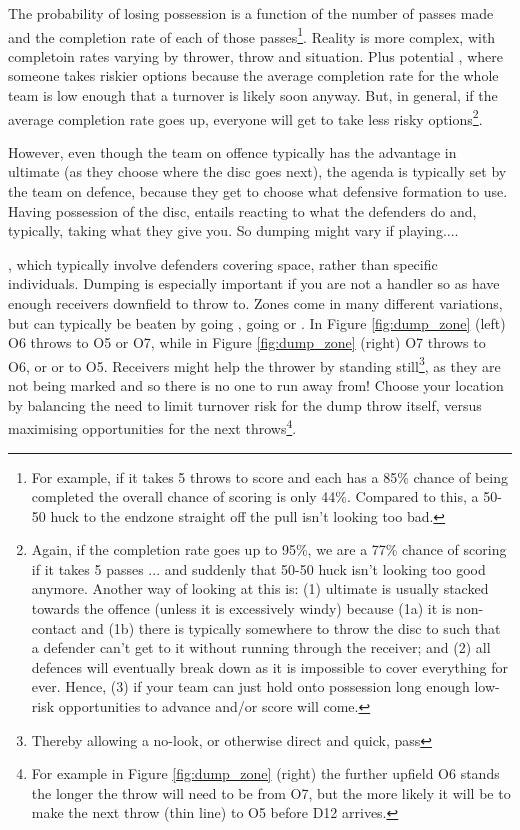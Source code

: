 \documentclass{tufte-handout}
\begin{document}
The probability 
of losing possession
is a function of 
the number of passes made 
and the completion rate of 
each of those passes\footnote{
For example,  
if it takes 5 throws
to score and 
each has a 85\% chance 
of being completed
the overall chance 
of scoring is only 44\%.
Compared to this, 
a 50-50 huck
to the endzone
straight off the pull 
isn't looking too bad.}.
Reality is more complex, 
with
completoin rates 
varying by 
thrower, 
throw 
and situation. 
Plus potential 
,  
where someone 
takes riskier options 
because the average 
completion rate 
for the whole team
is low enough 
that a turnover is 
likely soon anyway.
But, in general, 
if the average completion rate 
goes up, 
everyone will get 
to take less risky options\footnote{
Again,  
if the completion rate 
goes up 
to 95\%, 
we are a 77\% chance 
of scoring if it takes 
5 passes
... and suddenly 
that 50-50 huck 
isn't looking too good anymore. 
Another way of looking at this 
is: (1) ultimate
is usually stacked towards 
the offence 
(unless 
it is 
excessively 
windy)
because (1a) it is non-contact 
and (1b) there is 
typically 
somewhere
to throw the disc to 
such that a defender 
can't get to it without running 
through the receiver; 
and (2) all defences 
will eventually 
break down 
as it is impossible to 
cover everything 
for ever. 
Hence, 
(3) if your team 
can just hold onto
possession 
long enough
low-risk
opportunities to 
advance and/or score
will come.}.

However, 
even though 
the team on offence 
typically
has the advantage 
in ultimate 
(as they choose 
where the disc 
goes next), 
the agenda is 
typically set 
by the team 
on defence, 
because they 
get to choose 
what defensive formation 
to use.
Having possession 
of the disc, 
entails 
reacting 
to what 
the defenders 
do and, 
typically, 
taking what they give you. 
So dumping 
might vary if playing.... 

,
which typically
involve defenders 
covering space, 
rather than 
specific individuals. 
Dumping is 
especially important 
if you 
are not 
a handler 
so as have
enough 
receivers 
downfield 
to throw to.
Zones come in
many different variations, 
but can typically be 
beaten 
by going , 
going  or 
. 
In Figure \ref{fig:dump_zone}
(left) O6 throws 
to O5 or O7, 
while in Figure \ref{fig:dump_zone}
(right) O7 throws 
 to O6, 
or  
or  
to O5. 
Receivers
might help 
the thrower 
by standing still\footnote{
Thereby allowing 
a no-look, 
or otherwise direct 
and quick,
pass}, 
as they are not 
being marked 
and so there is no one 
to run away from!
Choose your location 
by balancing the 
need to 
limit turnover risk
for the dump throw itself, 
versus 
maximising 
opportunities 
for the next throws\footnote{
For example
in Figure \ref{fig:dump_zone} (right)
the further upfield O6 stands 
the longer the throw 
will need to be 
from O7, but
the more likely 
it will be to make 
the next throw 
(thin line) to O5 
before D12 arrives.}. 
\end{document}
